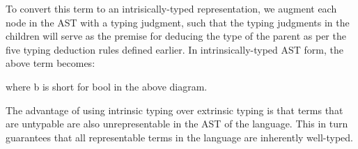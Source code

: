 \documentclass[12pt, letterpaper]{article}
\begin{document}
To convert this term to an intrisically-typed representation, we augment each node in the AST with a typing judgment, such that the typing judgments in the children will serve as the premise for deducing the type of the parent as per the five typing deduction rules defined earlier. In intrinsically-typed AST form, the above term becomes:
\begin{center}
\end{center}
where b is short for bool in the above diagram.

The advantage of using intrinsic typing over extrinsic typing is that terms that are untypable are also unrepresentable in the AST of the language. This in turn guarantees that all representable terms in the language are inherently well-typed.
\end{document}
